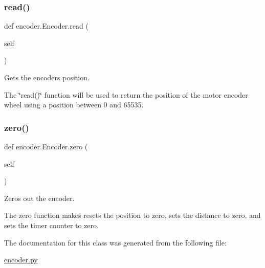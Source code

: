 \subsubsection{\texorpdfstring{read()}{read()}}
{\footnotesize\ttfamily def encoder.\+Encoder.\+read (\begin{DoxyParamCaption}\item[{}]{self }\end{DoxyParamCaption})}



Gets the encoder\textquotesingle{}s position. 

The \char`\"{}read()\char`\"{} function will be used to return the position of the motor encoder wheel using a position between 0 and 65535. \mbox{\label{classencoder_1_1_encoder_ae238ecdbcbce8a193c2e0ffbb4d1dd29}} 
\subsubsection{\texorpdfstring{zero()}{zero()}}
{\footnotesize\ttfamily def encoder.\+Encoder.\+zero (\begin{DoxyParamCaption}\item[{}]{self }\end{DoxyParamCaption})}



Zeros out the encoder. 

The zero function makes resets the position to zero, sets the distance to zero, and sets the timer counter to zero. 

The documentation for this class was generated from the following file\+:\begin{DoxyCompactItemize}
\item 
\mbox{\hyperlink{encoder_8py}{encoder.\+py}}\end{DoxyCompactItemize}
